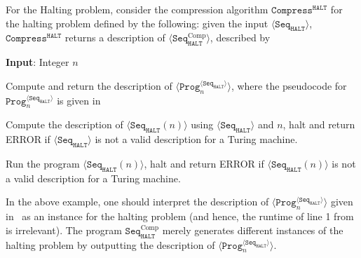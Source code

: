 \begin{example} \label{exam:haltcompressible}
	For the Halting problem, consider the compression algorithm $\texttt{Compress}^{\texttt{HALT}}$ for the halting problem defined by the following: given the input  $\langle \texttt{Seq}_{\texttt{HALT}} \rangle$, $\texttt{Compress}^{\texttt{HALT}}$ returns a description of $\langle \texttt{Seq}_{\texttt{HALT}}^{\text{Comp}}\rangle$, described by~
	
	\vspace{10pt}
	\IncMargin{1em}
	\begin{algorithm}[H]
		\DontPrintSemicolon
		\textbf{Input}: Integer $n$
		
		Compute and return the description of $\langle \texttt{Prog}_{n}^{\langle\texttt{Seq}_{\texttt{HALT}} \rangle } \rangle$, where the pseudocode for $\texttt{Prog}_{n}^{\langle\texttt{Seq}_{\texttt{HALT}} \rangle }$ is given in~
	
		\caption{The description of $\texttt{Seq}_{\texttt{HALT}}^{\text{Comp}}$.}
		\label{pseu:compressionhalt1}
	\end{algorithm}\DecMargin{1em}
	\vspace{10pt} 
	
	\vspace{10pt}
	\IncMargin{1em}
	\begin{algorithm}[H]
		\DontPrintSemicolon
		Compute the description of $\langle \texttt{Seq}_{\texttt{HALT}}(n) \rangle$ using $\langle \texttt{Seq}_{\texttt{HALT}} \rangle$ and $n$, halt and return ERROR if $\langle \texttt{Seq}_{\texttt{HALT}} \rangle$ is not a valid description for a Turing machine. 
		
		Run the program $\langle \texttt{Seq}_{\texttt{HALT}}(n) \rangle$, halt and return ERROR if $\langle \texttt{Seq}_{\texttt{HALT}}(n) \rangle$ is not a valid description for a Turing machine. 
		
		\caption{The description of the output for $\texttt{Prog}_{n}^{\langle\texttt{Seq}_{\texttt{HALT}} \rangle }$. We remark that the above program depends on both $\texttt{Seq}_{\texttt{HALT}}$ and $n$}
		\label{pseu:compressionhalt2}
	\end{algorithm}\DecMargin{1em}
	\vspace{10pt} 
	
	In the above example, one should interpret the description of $\langle \texttt{Prog}_{n}^{\langle\texttt{Seq}_{\texttt{HALT}} \rangle } \rangle$ given in~ as an instance for the halting problem (and hence, the runtime of line 1 from~ is irrelevant). The program $\texttt{Seq}_{\texttt{HALT}}^{\text{Comp}}$ merely generates different instances of the halting problem by outputting the description of $\langle \texttt{Prog}_{n}^{\langle\texttt{Seq}_{\texttt{HALT}} \rangle } \rangle$. 
	

\end{example}
